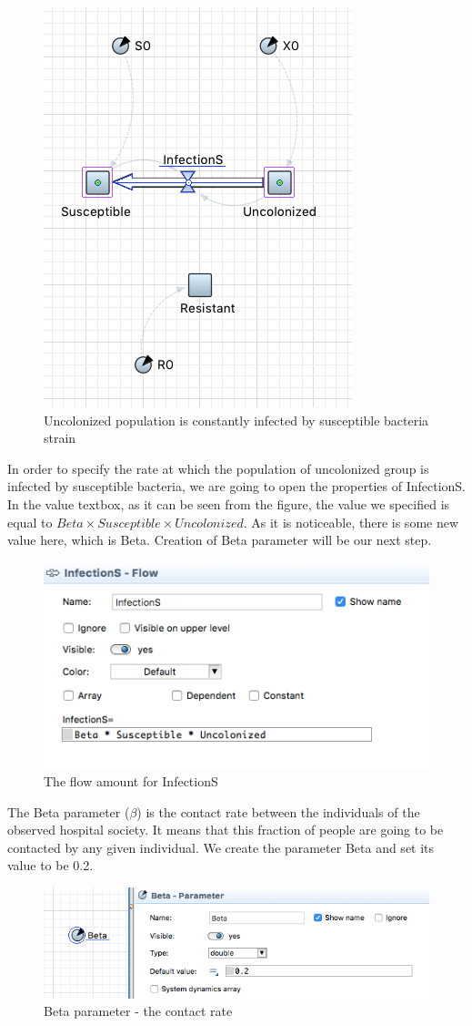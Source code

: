 \begin{figure}[H]
  \centering
  \includegraphics[height=0.6\textwidth]{img/screens/basic/basic13}
  \caption{Uncolonized population is constantly infected by susceptible bacteria strain}
\end{figure}

In order to specify the rate at which the population of uncolonized group is infected by susceptible bacteria, we are going to open the properties of InfectionS. In the value textbox, as it can be seen from the figure, the value we specified is equal to $Beta \times Susceptible \times Uncolonized$. As it is noticeable, there is some new value here, which is Beta. Creation of Beta parameter will be our next step.

\begin{figure}[H]
  \centering
  \includegraphics[height=0.3\textwidth]{img/screens/basic/basic12}
  \caption{The flow amount for InfectionS}
\end{figure}

The Beta parameter ($\beta$) is the contact rate between the individuals of the observed hospital society. It means that this fraction of people are going to be contacted by any given individual. We create the parameter Beta and set its value to be 0.2.

\begin{figure}[H]
  \centering
  \includegraphics[height=0.25\textwidth]{img/screens/basic/basic14}
  \caption{Beta parameter - the contact rate}
\end{figure}

